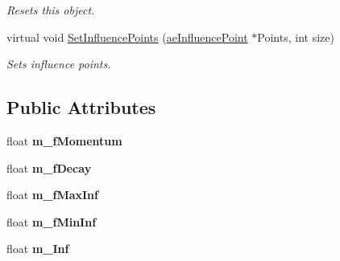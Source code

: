 \begin{DoxyCompactItemize}
\begin{DoxyCompactList}\small\item\em Resets this object. \end{DoxyCompactList}\item 
virtual void \hyperlink{classae_influence_calculator_aa581fbf63f74dc501a366ac264c2f12d}{Set\+Influence\+Points} (\hyperlink{structae_influence_point}{ae\+Influence\+Point} $\ast$Points, int size)
\begin{DoxyCompactList}\small\item\em Sets influence points. \end{DoxyCompactList}\end{DoxyCompactItemize}
\subsection*{Public Attributes}
\begin{DoxyCompactItemize}
\item 
float {\bfseries m\+\_\+f\+Momentum}\hypertarget{classae_influence_calculator_a11f861aacb6c3a58c23b1fa8eabbbc4b}{}\label{classae_influence_calculator_a11f861aacb6c3a58c23b1fa8eabbbc4b}

\item 
float {\bfseries m\+\_\+f\+Decay}\hypertarget{classae_influence_calculator_adde84abe917bba5fcfe453fda73571a6}{}\label{classae_influence_calculator_adde84abe917bba5fcfe453fda73571a6}

\item 
float {\bfseries m\+\_\+f\+Max\+Inf}\hypertarget{classae_influence_calculator_a617f4f4dded2b0078a200907b8101bde}{}\label{classae_influence_calculator_a617f4f4dded2b0078a200907b8101bde}

\item 
float {\bfseries m\+\_\+f\+Min\+Inf}\hypertarget{classae_influence_calculator_a9d3ddc8723c25d95407c74647e3e8287}{}\label{classae_influence_calculator_a9d3ddc8723c25d95407c74647e3e8287}

\item 
float {\bfseries m\+\_\+\+Inf}\hypertarget{classae_influence_calculator_ad41edf8a9a2708f63bd38c211b67736c}{}\label{classae_influence_calculator_ad41edf8a9a2708f63bd38c211b67736c}

\end{DoxyCompactItemize}
